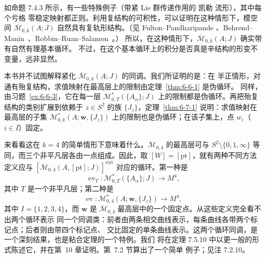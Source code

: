 如命题 7.4.3 所示，有一些特殊例子（带紧 Lie 群传递作用的 凯勒 流形），其中每个亏格
零稳定映射都正则。利用复结构的可积性，可以证明在这种情形下，模空间
$\overline{\mathcal M}_{0,k}(A;J)$ 自然具有复轨形结构。（见 Fulton--Pandharipande
、Behrend--Manin \,、Robbin--Ruan--Salamon \,。）
所以，在这种情形下，$\overline{\mathcal M}_{0,k}(A;J)$ 确实带有自然有理基本循环。
不过，在这个基本循环上的积分是否真是辛结构的形变不变量，远非显然。

本书并不试图解释紧化 $\overline{\mathcal M}_{0,k}(A;J)$ 的同调。我们所证明的是：在
半正情形，对通有殆复结构，求值映射在最高层上的限制由定理~\ref{thm:6-6-1} 是伪循环。
同样，由习题~\ref{ex:6-6-3}，它在每一层
$\mathcal M^*_{0,T}(\{A_\alpha\};J)$ 上的限制都是伪循环。再把殆复结构的类别扩展到依赖于
$z\in S^2$ 的族 $\{J_z\}$，定理~\ref{thm:6-7-1} 说明：求值映射在最高层的子集
$\mathcal M^*_{0,k}(A;\mathbf w,\{J_z\})$ 上的限制也是伪循环；在该子集上，点
$w_i$（$i\in I$）固定。

来看看这在 $k=4$ 的简单情形下意味着什么。$\overline{\mathcal M}_{0,4}$ 的最高层可与
$S^2\setminus\{0,1,\infty\}$ 等同，而三个非平凡层各由一点组成。因此，取
$[W]=[\mathrm{pt}]$，就有两种不同方法定义应与
$[\overline{\mathcal M}_{0,4}(A,[\mathrm{pt}];J)]^{\mathrm{virt}}$ 对应的循环。第一种是
\[
  \operatorname{ev}_T:\mathcal M^*_{0,T}(\{A_\alpha\};J)\longrightarrow M^4,
\]
其中 $T$ 是一个非平凡层；第二种是
\[
  \operatorname{ev}:\mathcal M^*_{0,4}(A;\mathbf w,\{J_z\})\longrightarrow M^4,
\]
其中 $I=\{1,2,3,4\}$，而 $\mathbf w$ 是
$\overline{\mathcal M}_{0,4}$ 最高层中的一个固定点。从这些定义完全看不出两个循环表示
同一个同调类：前者由两条相交曲线表示，每条曲线各带两个标记点；后者则由带四个标记点、
交比固定的单条曲线表示。这两个循环同调，是一个深刻结果，也是粘合定理的一个特例。我们
将在定理 7.5.10 中以更一般的形式陈述它，并在第~10 章证明。第~7.2 节算出了一个简单
例子；见注 7.2.10。

